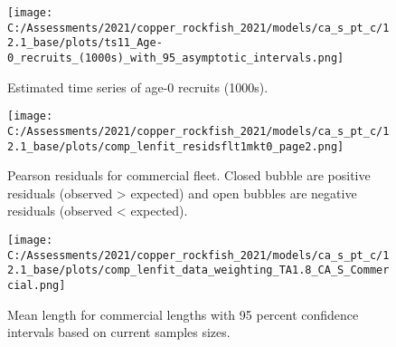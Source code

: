 \documentclass[11pt,
  english,
  a4paper,
]{article}
\begin{document}
\tagmcend\tagstructend


\begin{figure}
\centering
\texttt{[image: C:/Assessments/2021/copper\_rockfish\_2021/models/ca\_s\_pt\_c/12.1\_base/plots/ts11\_Age-0\_recruits\_(1000s)\_with\_95\_asymptotic\_intervals.png]}
\caption{Estimated time series of age-0 recruits (1000s).\label{fig:recruits}}
\end{figure}

\tagmcend\tagstructend


\begin{figure}
\centering
\texttt{[image: C:/Assessments/2021/copper\_rockfish\_2021/models/ca\_s\_pt\_c/12.1\_base/plots/comp\_lenfit\_residsflt1mkt0\_page2.png]}
\caption{Pearson residuals for commercial fleet. Closed bubble are positive residuals (observed \textgreater{} expected) and open bubbles are negative residuals (observed \textless{} expected).\label{fig:com-pearson}}
\end{figure}

\tagmcend\tagstructend


\begin{figure}
\centering
\texttt{[image: C:/Assessments/2021/copper\_rockfish\_2021/models/ca\_s\_pt\_c/12.1\_base/plots/comp\_lenfit\_data\_weighting\_TA1.8\_CA\_S\_Commercial.png]}
\caption{Mean length for commercial lengths with 95 percent confidence intervals based on current samples sizes.\label{fig:com-mean-len-fit}}
\end{figure}

\tagmcend\tagstructend

\end{document}
